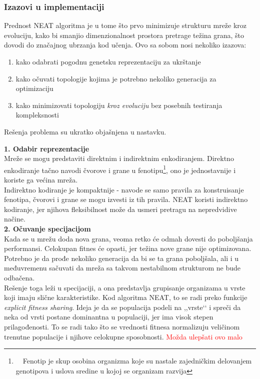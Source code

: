 \documentclass[a4paper]{article}
\begin{document}
\subsubsection*{Izazovi u implementaciji}
\label{izazovi}
Prednost NEAT algoritma je u tome što prvo minimizuje strukturu mreže kroz evoluciju, kako bi smanjio dimenzionalnost prostora pretrage težina grana, što dovodi do značajnog ubrzanja kod učenja. Ovo sa sobom nosi nekoliko izazova:

\begin{enumerate}[topsep=1pt, itemsep=-1ex, partopsep=1ex, parsep=1ex]
\item kako odabrati pogodnu genetsku reprezentaciju za ukrštanje
\item kako očuvati topologije kojima je potrebno nekoliko generacija za optimizaciju
\item kako minimizovati topologiju \emph{kroz evoluciju} bez posebnih testiranja kompleksnosti
\end{enumerate}
Rešenja problema su ukratko objašnjena u nastavku.

\pagebreak

\noindent
\label{reprezentacija}
\textbf{1. Odabir reprezentacije} \\
\indent
Mreže se mogu predstaviti direktnim i indirektnim enkodiranjem. Direktno enkodiranje tačno navodi čvorove i grane u fenotipu\footnote{~~Fenotip je skup osobina organizma koje su nastale zajedničkim delovanjem genotipova i uslova sredine u kojoj se organizam razvija}, ono je jednostavnije i koriste ga većina mreža.\\
Indirektno kodiranje je kompaktnije - navode se samo pravila za konstruisanje fenotipa, čvorovi i grane se mogu izvesti iz tih pravila. NEAT koristi indirektno kodiranje, jer njihova fleksibilnost može da usmeri pretragu na nepredvidive načine. \\

\noindent
\label{specijacija}
\textbf{2. Očuvanje specijacijom} \\
\indent
Kada se u mrežu doda nova grana, veoma retko će odmah dovesti do poboljšanja performansi. Celokupan fitnes će opasti, jer težina nove grane nije optimizovana. Potrebno je da prođe nekoliko generacija da bi se ta grana poboljšala, ali i u međuvremenu sačuvati da mreža sa takvom nestabilnom strukturom ne bude odbačena.\\
Rešenje toga leži u specijaciji, a ona predstavlja grupisanje organizama u vrste koji imaju slične karakteristike. Kod algoritma NEAT, to se radi preko funkcije \textit{explicit fitness sharing}. Ideja je da se populacija podeli na ,,vrste‘‘ i spreči da neka od vrsti postane dominantna u populaciji, jer ima visok stepen prilagođenosti. To se radi tako što se vrednosti fitnesa normalizuju veličinom trenutne populacije i njihove celokupne sposobnosti. \textcolor{red}{Možda ulepšati ovo malo} \\
\end{document}
